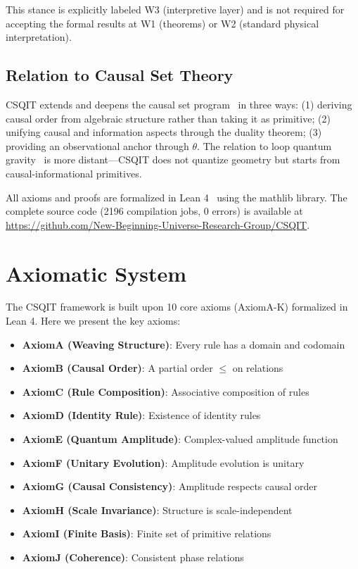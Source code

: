 \documentclass[aps,prd,twocolumn,nofootinbib,floatfix]{revtex4-2}
\begin{document}
This stance is explicitly labeled W3 (interpretive layer) and is not required for accepting the formal results at W1 (theorems) or W2 (standard physical interpretation).

\subsection{Relation to Causal Set Theory}

CSQIT extends and deepens the causal set program~\cite{Bombelli1987, Sorkin2005} in three ways: (1) deriving causal order from algebraic structure rather than taking it as primitive; (2) unifying causal and information aspects through the duality theorem; (3) providing an observational anchor through $\theta$. The relation to loop quantum gravity~\cite{Ambjorn1995} is more distant---CSQIT does not quantize geometry but starts from causal-informational primitives.

All axioms and proofs are formalized in Lean 4~\cite{Lean2024} using the mathlib library. The complete source code (2196 compilation jobs, 0 errors) is available at \url{https://github.com/New-Beginning-Universe-Research-Group/CSQIT}.

\section{Axiomatic System}

The CSQIT framework is built upon 10 core axioms (AxiomA-K) formalized in Lean 4. Here we present the key axioms:

\begin{itemize}
    \item \textbf{AxiomA (Weaving Structure)}: Every rule has a domain and codomain
    \item \textbf{AxiomB (Causal Order)}: A partial order $\le$ on relations
    \item \textbf{AxiomC (Rule Composition)}: Associative composition of rules
    \item \textbf{AxiomD (Identity Rule)}: Existence of identity rules
    \item \textbf{AxiomE (Quantum Amplitude)}: Complex-valued amplitude function
    \item \textbf{AxiomF (Unitary Evolution)}: Amplitude evolution is unitary
    \item \textbf{AxiomG (Causal Consistency)}: Amplitude respects causal order
    \item \textbf{AxiomH (Scale Invariance)}: Structure is scale-independent
    \item \textbf{AxiomI (Finite Basis)}: Finite set of primitive relations
    \item \textbf{AxiomJ (Coherence)}: Consistent phase relations
\end{itemize}
\end{document}
